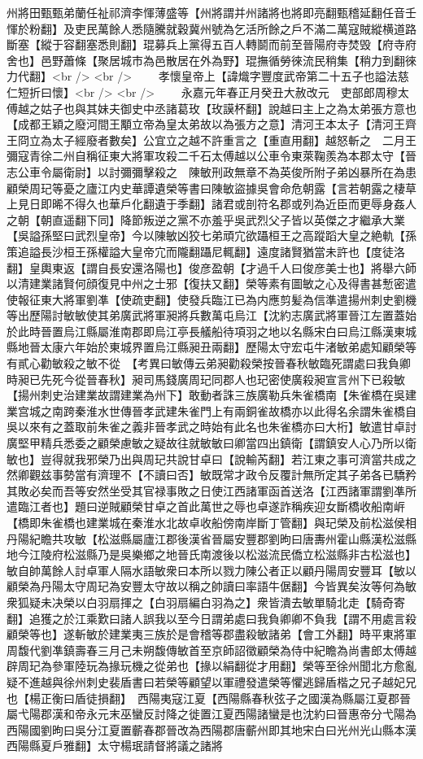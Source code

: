 州將田甄甄弟蘭任祉祁濟李惲薄盛等【州將謂并州諸將也將即亮翻甄稽延翻任音壬惲於粉翻】及吏民萬餘人悉隨騰就穀冀州號為乞活所餘之戶不滿二萬寇賊縱横道路斷塞【縱于容翻塞悉則翻】琨募兵上黨得五百人轉鬬而前至晉陽府寺焚毁【府寺府舍也】邑野蕭條【聚居城市為邑散居在外為野】琨撫循勞徠流民稍集【稍力到翻徠力代翻】<br />
<br />
　　孝懷皇帝上【諱熾字豐度武帝第二十五子也謚法慈仁短折曰懷】<br />
<br />
　　永嘉元年春正月癸丑大赦改元　吏部郎周穆太傅越之姑子也與其妹夫御史中丞諸葛玫【玫謨杯翻】說越曰主上之為太弟張方意也【成都王穎之廢河間王顒立帝為皇太弟故以為張方之意】清河王本太子【清河王齊王冏立為太子經廢者數矣】公宜立之越不許重言之【重直用翻】越怒斬之　二月王彌寇青徐二州自稱征東大將軍攻殺二千石太傅越以公車令東萊鞠羨為本郡太守【晉志公車令屬衛尉】以討彌彌擊殺之　陳敏刑政無章不為英俊所附子弟凶暴所在為患顧榮周玘等憂之廬江内史華譚遺榮等書曰陳敏盜據吳會命危朝露【言若朝露之棲草上見日即晞不得久也華戶化翻遺于季翻】諸君或剖符名郡或列為近臣而更辱身姦人之朝【朝直遥翻下同】降節叛逆之黨不亦羞乎吳武烈父子皆以英傑之才繼承大業【吳謚孫堅曰武烈皇帝】今以陳敏凶狡七弟頑宂欲躡桓王之高蹤蹈大皇之絶軌【孫策追謚長沙桓王孫權謚大皇帝宂而隴翻躡尼輒翻】遠度諸賢猶當未許也【度徒洛翻】皇輿東返【謂自長安還洛陽也】俊彦盈朝【才過千人曰俊彦美士也】將舉六師以清建業諸賢何顔復見中州之士邪【復扶又翻】榮等素有圖敏之心及得書甚慙密遣使報征東大將軍劉凖【使疏吏翻】使發兵臨江已為内應剪髪為信準遣揚州刺史劉機等出歷陽討敏敏使其弟廣武將軍昶將兵數萬屯烏江【沈約志廣武將軍晉江左置蓋始於此時晉置烏江縣屬淮南郡即烏江亭長艤船待項羽之地以名縣宋白曰烏江縣漢東城縣地晉太康六年始於東城界置烏江縣昶丑兩翻】歷陽太守宏屯牛渚敏弟處知顧榮等有貳心勸敏殺之敏不從　【考異曰敏傳云弟昶勸殺榮按晉春秋敏臨死謂處曰我負卿時昶已先死今從晉春秋】昶司馬錢廣周玘同郡人也玘密使廣殺昶宣言州下已殺敏【揚州刺史治建業故謂建業為州下】敢動者誅三族廣勒兵朱雀橋南【朱雀橋在吳建業宫城之南跨秦淮水世傳晉孝武建朱雀門上有兩銅雀故橋亦以此得名余謂朱雀橋自吳以來有之蓋取前朱雀之義非晉孝武之時始有此名也朱雀橋亦曰大桁】敏遣甘卓討廣堅甲精兵悉委之顧榮慮敏之疑故往就敏敏曰卿當四出鎮衛【謂鎮安人心乃所以衛敏也】豈得就我邪榮乃出與周玘共說甘卓曰【說輸芮翻】若江東之事可濟當共成之然卿觀兹事勢當有濟理不【不讀曰否】敏既常才政令反覆計無所定其子弟各已驕矜其敗必矣而吾等安然坐受其官禄事敗之日使江西諸軍函首送洛【江西諸軍謂劉凖所遣臨江者也】題曰逆賊顧榮甘卓之首此萬世之辱也卓遂詐稱疾迎女斷橋收船南㟁【橋即朱雀橋也建業城在秦淮水北故卓收船傍南岸斷丁管翻】與玘榮及前松滋侯相丹陽紀瞻共攻敏【松滋縣屬廬江郡後漢省晉屬安豐郡劉昫曰唐夀州霍山縣漢松滋縣地今江陵府松滋縣乃是吳樂鄉之地晉氏南渡後以松滋流民僑立松滋縣非古松滋也】敏自帥萬餘人討卓軍人隔水語敏衆曰本所以戮力陳公者正以顧丹陽周安豐耳【敏以顧榮為丹陽太守周玘為安豐太守故以稱之帥讀曰率語牛倨翻】今皆異矣汝等何為敏衆狐疑未决榮以白羽扇揮之【白羽扇編白羽為之】衆皆潰去敏單騎北走【騎奇寄翻】追獲之於江乘歎曰諸人誤我以至今日謂弟處曰我負卿卿不負我【謂不用處言殺顧榮等也】遂斬敏於建業夷三族於是會稽等郡盡殺敏諸弟【會工外翻】時平東將軍周馥代劉凖鎮壽春三月己未朔馥傳敏首至京師詔徵顧榮為侍中紀瞻為尚書郎太傅越辟周玘為參軍陸玩為掾玩機之從弟也【掾以絹翻從才用翻】榮等至徐州聞北方愈亂疑不進越與徐州刺史裴盾書曰若榮等顧望以軍禮發遣榮等懼逃歸盾楷之兄子越妃兄也【楊正衡曰盾徒損翻】　西陽夷寇江夏【西陽縣春秋弦子之國漢為縣屬江夏郡晉屬弋陽郡漢和帝永元末巫蠻反討降之徙置江夏西陽諸蠻是也沈約曰晉惠帝分弋陽為西陽國劉昫曰吳分江夏置蘄春郡晉改為西陽郡唐蘄州即其地宋白曰光州光山縣本漢西陽縣夏戶雅翻】太守楊珉請督將議之諸將